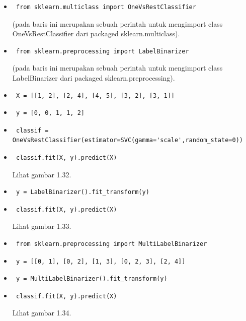 \begin{enumerate}
\begin{itemize}
\item\begin{verbatim} from sklearn.multiclass import OneVsRestClassifier\end{verbatim}(pada baris ini merupakan sebuah perintah untuk mengimport class OneVsRestClassifier dari packaged sklearn.multiclass).
\item\begin{verbatim} from sklearn.preprocessing import LabelBinarizer\end{verbatim}(pada baris ini merupakan sebuah perintah untuk mengimport class LabelBinarizer dari packaged sklearn.preprocessing).
\item\begin{verbatim} X = [[1, 2], [2, 4], [4, 5], [3, 2], [3, 1]]\end{verbatim}
\item\begin{verbatim} y = [0, 0, 1, 1, 2]\end{verbatim}
\item\begin{verbatim} classif = OneVsRestClassifier(estimator=SVC(gamma='scale',random_state=0))\end{verbatim}
\item\begin{verbatim} classif.fit(X, y).predict(X)\end{verbatim} Lihat gambar 1.32.
\item\begin{verbatim} y = LabelBinarizer().fit_transform(y)\end{verbatim}
\item\begin{verbatim} classif.fit(X, y).predict(X)\end{verbatim} Lihat gambar 1.33.
\item\begin{verbatim} from sklearn.preprocessing import MultiLabelBinarizer\end{verbatim}
\item\begin{verbatim} y = [[0, 1], [0, 2], [1, 3], [0, 2, 3], [2, 4]]\end{verbatim}
\item\begin{verbatim} y = MultiLabelBinarizer().fit_transform(y)\end{verbatim}
\item\begin{verbatim} classif.fit(X, y).predict(X)\end{verbatim} Lihat gambar 1.34.
\end{itemize}
\end{enumerate}

